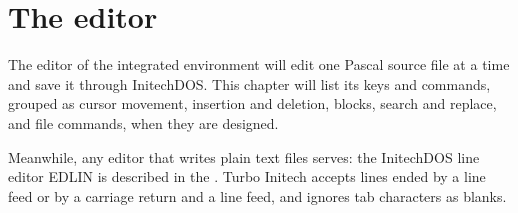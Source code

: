 \chapter{The editor}

The editor of the integrated environment will edit one Pascal source file
at a time and save it through InitechDOS.  This chapter will list its keys
and commands, grouped as cursor movement, insertion and deletion, blocks,
search and replace, and file commands, when they are designed.

Meanwhile, any editor that writes plain text files serves: the InitechDOS
line editor EDLIN is described in the .
Turbo Initech accepts lines ended by a line feed or by a carriage return
and a line feed, and ignores tab characters as blanks.
